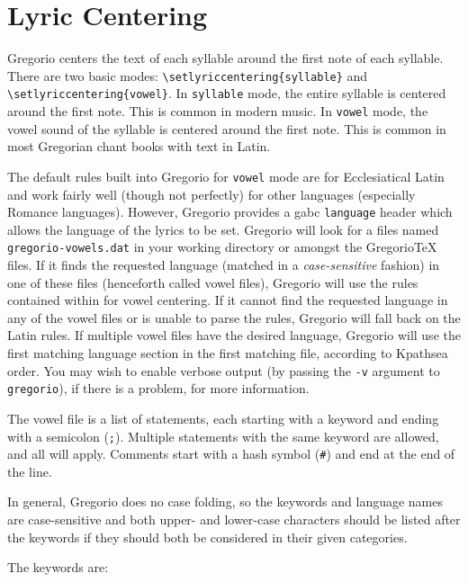 \section{Lyric Centering}

Gregorio centers the text of each syllable around the first note of each
syllable.  There are two basic modes: \verb:\setlyriccentering{syllable}:
and \verb:\setlyriccentering{vowel}:.  In \texttt{syllable} mode, the
entire syllable is centered around the first note.  This is common in
modern music.  In \texttt{vowel} mode, the vowel sound of the syllable is
centered around the first note.  This is common in most Gregorian chant
books with text in Latin.

The default rules built into Gregorio for \texttt{vowel} mode are for
Ecclesiatical Latin and work fairly well (though not perfectly) for
other languages (especially Romance languages).  However, Gregorio
provides a gabc \texttt{language} header which allows the language of
the lyrics to be set.  Gregorio will look for a files named
\texttt{gregorio-vowels.dat} in your working directory or amongst the
GregorioTeX files.  If it finds the requested language (matched in a
\emph{case-sensitive} fashion) in one of these files (henceforth called
vowel files), Gregorio will use the rules contained within for vowel
centering.  If it cannot find the requested language in any of the vowel
files or is unable to parse the rules, Gregorio will fall back on the
Latin rules.  If multiple vowel files have the desired language,
Gregorio will use the first matching language section in the first
matching file, according to Kpathsea order.  You may wish to enable
verbose output (by passing the \texttt{-v} argument to
\texttt{gregorio}), if there is a problem, for more information.

The vowel file is a list of statements, each starting with a keyword and
ending with a semicolon (\texttt{;}).  Multiple statements with the same
keyword are allowed, and all will apply.  Comments start with a hash
symbol (\texttt{\#}) and end at the end of the line.

In general, Gregorio does no case folding, so the keywords and language
names are case-sensitive and both upper- and lower-case characters
should be listed after the keywords if they should both be considered in
their given categories.

The keywords are:

